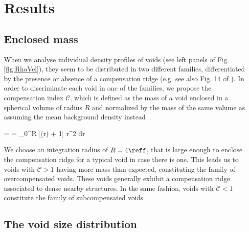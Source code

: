 \documentclass[a4,useAMS,usenatbib,usegraphicx]{latex/mn2e}
\begin{document}
\section{Results}
\label{sec:results}


\subsection{Enclosed mass}
\label{subsec:enclosedmass}


When we analyse individual density profiles of voids (see left panels of
Fig. \ref{fig:RhoVel}), they seem to be distributed in two different 
families, differentiated by the presence or absence of a compensation 
ridge (e.g. see also Fig. 14 of \citet{Colberg05}). In order to 
discriminate each void in one of the families, we propose the compensation 
index $\mathcal{C}$, which is defined as the mass of a void enclosed in a 
spherical volume of radius $R$ and normalized by the mass of the same 
volume as assuming the mean background density instead

{ =  =  \int_0^{R} [\delta(r) + 1] r^2 dr}

We choose an integration radius of $R=4\reff$, that is large enough to 
enclose the compensation ridge for a typical void in case there is one. 
This leads us to voids with $\mathcal{C}>1$ having more mass than expected, 
constituting the family of overcompensated voids. These voids generally 
exhibit a compensation ridge associated to dense nearby structures. In the 
same fashion, voids with $\mathcal{C}<1$ constitute the family of 
subcompensated voids.


\subsection{The void size distribution}
\label{subsec:shape_voids}
\end{document}
